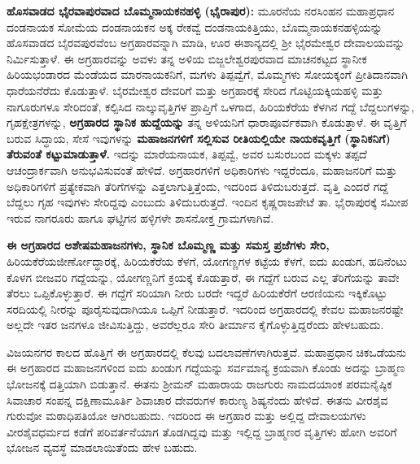 \textbf{ಹೊಸವಾಡದ ಭೈರವಾಪುರವಾದ ಬೊಮ್ಮನಾಯಕನಹಳ್ಳಿ \general{\enginline{-}} (ಭೈರಾಪುರ):} ಮೂರನೆಯ ನರಸಿಂಹನ ಮಹಾಪ್ರಧಾನ ದಂಡನಾಯಕ ಸೋಮೆಯ ದಂಡನಾಯಕನ ಅಕ್ಕ ರೇಕವ್ವೆ ದಂಡನಾಯಕಿತ್ತಿಯು, ಬೊಮ್ಮನಾಯಕನಹಳ್ಳಿಯನ್ನು ಹೊಸವಾಡದ ಬೈರವಪುರವೆಂಬ ಅಗ್ರಹಾರವನ್ನಾಗಿ ಮಾಡಿ, ಊರ ಈಶಾನ್ಯದಲ್ಲಿ ಶ‍್ರೀ ಭೈರಮೇಶ್ವರ ದೇವಾಲಯವನ್ನು ನಿರ್ಮಿಸುತ್ತಾಳೆ. ಈ ಅಗ್ರಹಾರವನ್ನು ಅವಳು ತನ್ನ ಅಳಿಯ ಬಿಜ್ಜಲೇಶ್ವರಪುರವಾದ ಮಾಚನಕಟ್ಟದ ಸ್ಥಾನೀಕ ಹಿರಿಯಭಂಡಾರದ ಮೆಂಡೆಯದ ಮಾರನಾಯಕನಿಗೆ, ಮಗಳು ತಿಪ್ಪವ್ವೆಗೆ, ಮೊಮ್ಮಗಳು ಸೋಯಕ್ಕಂಗೆ ಪ್ರೀತಿದಾನವಾಗಿ ಧಾರೆಯನೆರೆದು ಕೊಡುತ್ತಾಳೆ. ಬೈರಮೇಶ್ವರ ದೇವರಿಗೆ ಮತ್ತು ಅಗ್ರಹಾರಕ್ಕೆ ಸೇರಿದ ಗೊಟ್ಟಿಯಕ್ಕಿಯಹಳ್ಳಿ ಮತ್ತು ನಾಗೂರುಗಳೂ ಸೇರಿದಂತೆ, ಕಲ್ಪಿಸಿದ ನಾಲ್ಕುವೃತ್ತಿಗಳ ಪ್ರಾಪ್ತಿಗೆ ಒಳಗಾದ, ಹಿರಿಯಕೆರೆಯ ಕೆಳಗಿನ ಗದ್ದೆ ಬೆದ್ದಲುಗಳನ್ನು, ಗೃಹಕ್ಷೇತ್ರಗಳನ್ನು, \textbf{ಅಗ್ರಹಾರದ ಸ್ಥಾನಿಕ ಹುದ್ದೆಯನ್ನು} ತನ್ನ ಅಳಿಯನಿಗೆ ಧಾರಾಪೂರ್ವಕವಾಗಿ ಕೊಡುತ್ತಾಳೆ. ಈ ವೃತ್ತಿಗೆ ಬರುವ ಸಿದ್ಧಾಯ, ಸೇಸೆ ಇವುಗಳನ್ನು \textbf{ಮಹಾಜನಗಳಿಗೆ ಸಲ್ಲಿಸುವ ರೀತಿಯಲ್ಲಿಯೇ ನಾಯಕವೃತ್ತಿಗೆ (ಸ್ಥಾನಿಕನಿಗೆ) ತೆರುವಂತೆ ಕಟ್ಟುಮಾಡುತ್ತಾಳೆ.} ಇದನ್ನು ಮಾರೆಯನಾಯಕ, ತಿಪ್ಪವ್ವೆ, ಅವರ ಬಸುರಬಂದ ಮಕ್ಕಳು ತಪ್ಪದೆ ಆಚಂದ್ರಾರ್ಕವಾಗಿ ಅನುಭವಿಸುವಂತೆ ಹೇಳಿದೆ. ಅಗ್ರಹಾರಗಳಿಗೆ ಅಧಿಕಾರಿಗಳು ಇದ್ದರೆಂದೂ, ಮಹಾಜನರಿಗೆ ಮತ್ತು ಅಧಿಕಾರಿಗಳಿಗೆ ಪ್ರತ್ಯೇಕವಾಗಿ ತೆರಿಗೆಗಳನ್ನು ಎತ್ತಲಾಗು\-ತ್ತಿತ್ತೆಂದು, ಇದರಿಂದ ತಿಳಿದುಬರುತ್ತದೆ. ವೃತ್ತಿ ಎಂದರೆ ಗದ್ದೆ ಬೆದ್ದಲು ಗೃಹ ಇವುಗಳು ಸೇರಿದ್ದವು ಎಂಬುದು ತಿಳಿದುಬರುತ್ತದೆ. ಇಂದಿನ ಕೃಷ್ಣರಾಜಪೇಟೆ ತಾ. ಭೈರಾಪುರಕ್ಕೆ ಸಮೀಪ ಇರುವ ನಾಗರೂರು ಹಾಗೂ ಘಟ್ಟಿಗನ ಹಳ್ಳಿಗಳೇ ಶಾಸನೋಕ್ತ ಗ್ರಾಮಗಳಾಗಿವೆ.

\textbf{ಈ ಅಗ್ರಹಾರದ ಅಶೇಷಮಹಾಜನಗಳು, ಸ್ಥಾನಿಕ ಬೊಮ್ಮಣ್ಣ ಮತ್ತು ಸಮಸ್ತ ಪ್ರಜೆಗಳು ಸೇರಿ,} ಹಿರಿಯಕೆರೆಯ\break ಜೀರ್ಣೋದ್ಧಾರಕ್ಕೆ, ಹಿರಿಯಕೆರೆಯ ಕೆಳಗೆ, ಯೋಗಣ್ಣಗಳ ಕಟ್ಟೆಯ ಕೆಳಗೆ, ಐದು ಖಂಡುಗ, ಹದಿನೆಂಟು ಕೊಳಗ ಬೀಜವರಿ ಗದ್ದೆಯನ್ನು, ಯೋಗಣ್ಣನಿಗೆ ಕ್ರಯಕ್ಕೆ ಕೊಡುತ್ತಾರೆ, ಈ ಗದ್ದೆಗೆ ಬರುವ ಎಲ್ಲ ತೆರಿಗೆಯನ್ನು ತಾವೇ ತೆರಲು ಒಪ್ಪಿಕೊಳ್ಳುತ್ತಾರೆ. ಈ ಗದ್ದೆಗೆ ಸರಿಯಾಗಿ ನೀರು ಬರದೇ ಇದ್ದರೆ ಹಿರಿಯಕೆರೆಗೆ ಆರಣಿಯನು ಇಕ್ಕಿಕೊಟ್ಟು ಸರದಿಯಲ್ಲಿ ನೀರನ್ನು ಪೂರೈಸುವುದಾಗಿಯೂ ಒಪ್ಪಿಗೆ ನೀಡುತ್ತಾರೆ. ಇದರಿಂದ ಅಗ್ರಹಾರದಲ್ಲಿ ಕೇವಲ ಮಹಾಜನರಷ್ಟೇ ಅಲ್ಲದೇ ಇತರ ಜನಗಳೂ ಜೀವಿಸುತ್ತಿದ್ದು, ಅವರೆಲ್ಲರೂ ಸೇರಿ ತೀರ್ಮಾನ ಕೈಗೊಳ್ಳುತ್ತಿದ್ದರೆಂದು ಹೇಳಬಹುದು.

ವಿಜಯನಗರ ಕಾಲದ ಹೊತ್ತಿಗೆ ಈ ಅಗ್ರಹಾರದಲ್ಲಿ ಕೆಲವು ಬದಲಾವಣೆಗಳಾಗಿರುತ್ತವೆ. ಮಹಾಪ್ರಧಾನ ಚಿಕಒಡೆಯನು ಈ ಅಗ್ರಹಾರದ ಮಹಾಜನಗಳಿಂದ ಐದು ಖಂಡುಗ ಗದ್ದೆಯನ್ನು ಸರ್ವಮಾನ್ಯ ಕ್ರಯವಾಗಿ ಕೊಂಡು ಅದನ್ನು ಬ್ರಾಹ್ಮಣ ಭೋಜನಕ್ಕೆ ದತ್ತಿಯಾಗಿ ಬಿಡುತ್ತಾನೆ. ಈತನು ಶ‍್ರೀಮನ್​ ಮಹಾರಾಯ ರಾಜಗುರು ನಾಮದಯಾಂಕ ಪರಮನೈಷ್ಠಿಕ ಸಿವಾಚಾರ ಸಂಪನ್ನ ದಕ್ಷಿಣಾಮೂರ್ತಿ ಶಿವಾಚಾರ ದೇವರುಗಳ ಕಾರುಣ್ಯ ಶಿಷ್ಯನೆಂದು ಹೇಳಿದೆ. ಈತನು ವೀರಶೈವ ಗುರುವೋ ಮಠಾಧಿಪತಿಯೋ ಆಗಿರಬಹುದು. ಇದರಿಂದ ಈ ಅಗ್ರಹಾರ ಮತ್ತು ಅಲ್ಲಿದ್ದ ದೇವಾಲಯಗಳು ವೀರಶೈವಧರ್ಮದ ಕಡೆಗೆ ಪರಿವರ್ತನೆಯಾಗ ತೊಡಗಿದ್ದವು ಮತ್ತು ಇಲ್ಲಿದ್ದ ಬ್ರಾಹ್ಮಣರ ವೃತ್ತಿಗಳು ಹೋಗಿ ಅವರಿಗೆ ಭೋಜನ ವ್ಯವಸ್ಥೆ ಮಾಡಲಾಯಿತೆಂದು ಹೇಳ ಬಹುದು.

